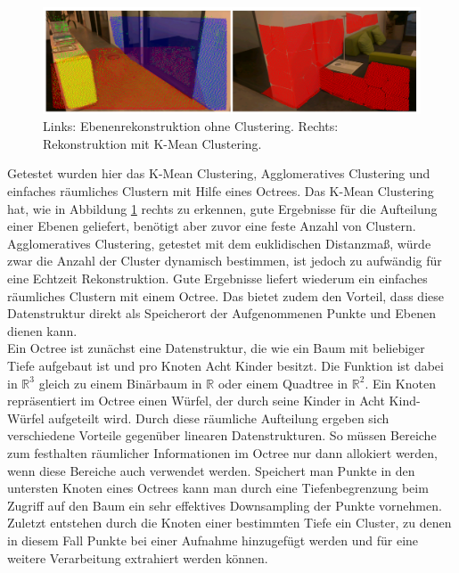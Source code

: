 \begin{figure}
  \centering
	\includegraphics[width=1.0\textwidth]{content/images/methods/clustering.png} 
  \caption{Links: Ebenenrekonstruktion ohne Clustering. Rechts: Rekonstruktion mit K-Mean Clustering.}
  \label{fig:clustering}
\end{figure}

Getestet wurden hier das K-Mean Clustering, Agglomeratives Clustering und einfaches räumliches Clustern mit Hilfe eines Octrees. Das K-Mean Clustering hat, wie in Abbildung \ref{fig:clustering} rechts zu erkennen, gute Ergebnisse für die Aufteilung einer Ebenen geliefert, benötigt aber zuvor eine feste Anzahl von Clustern. Agglomeratives Clustering, getestet mit dem euklidischen Distanzmaß, würde zwar die Anzahl der Cluster dynamisch bestimmen, ist jedoch zu aufwändig für eine Echtzeit Rekonstruktion. Gute Ergebnisse liefert wiederum ein einfaches räumliches Clustern mit einem Octree. Das bietet zudem den Vorteil, dass diese Datenstruktur direkt als Speicherort der Aufgenommenen Punkte und Ebenen dienen kann. \\

Ein Octree ist zunächst eine Datenstruktur, die wie ein Baum mit beliebiger Tiefe aufgebaut ist und pro Knoten Acht Kinder besitzt. Die Funktion ist dabei in \(\mathbb{R}^3\) gleich zu einem Binärbaum in \(\mathbb{R}\) oder einem Quadtree in \(\mathbb{R}^2\). Ein Knoten repräsentiert im Octree einen Würfel, der durch seine Kinder in Acht Kind-Würfel aufgeteilt wird. Durch diese räumliche Aufteilung ergeben sich verschiedene Vorteile gegenüber linearen Datenstrukturen. So müssen Bereiche zum festhalten räumlicher Informationen im Octree nur dann allokiert werden, wenn diese Bereiche auch verwendet werden. Speichert man Punkte in den untersten Knoten eines Octrees kann man durch eine Tiefenbegrenzung beim Zugriff auf den Baum ein sehr effektives Downsampling der Punkte vornehmen. Zuletzt entstehen durch die Knoten einer bestimmten Tiefe ein Cluster, zu denen in diesem Fall Punkte bei einer Aufnahme hinzugefügt werden und für eine weitere Verarbeitung extrahiert werden können.\\

